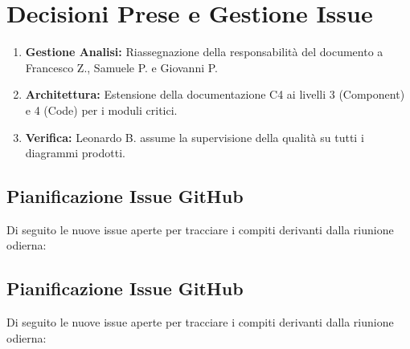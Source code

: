\documentclass[a4paper, 11pt, oneside]{scrartcl} %
\begin{document}
\newpage
\section{Decisioni Prese e Gestione Issue}

\begin{enumerate}
    \item \textbf{Gestione Analisi:} Riassegnazione della responsabilità del documento a Francesco Z., Samuele P. e Giovanni P.
    \item \textbf{Architettura:} Estensione della documentazione C4 ai livelli 3 (Component) e 4 (Code) per i moduli critici.
    \item \textbf{Verifica:} Leonardo B. assume la supervisione della qualità su tutti i diagrammi prodotti.
\end{enumerate}

\subsection{Pianificazione Issue GitHub}
Di seguito le nuove issue aperte per tracciare i compiti derivanti dalla riunione odierna:

\subsection{Pianificazione Issue GitHub}
Di seguito le nuove issue aperte per tracciare i compiti derivanti dalla riunione odierna:
\end{document}
